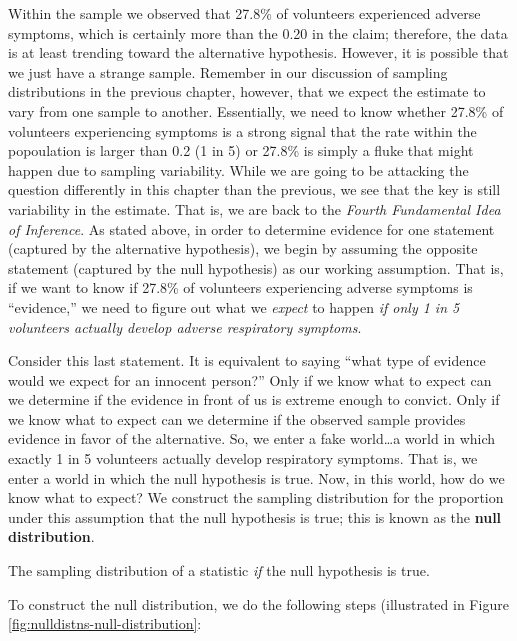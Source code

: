 \documentclass[]{book}
\theoremstyle{definition}
\theoremstyle{definition}
\theoremstyle{definition}
\theoremstyle{remark}
\let\BeginKnitrBlock\begin \let\EndKnitrBlock\end
\begin{document}
Within the sample we observed that 27.8\% of volunteers experienced
adverse symptoms, which is certainly more than the 0.20 in the claim;
therefore, the data is at least trending toward the alternative
hypothesis. However, it is possible that we just have a strange sample.
Remember in our discussion of sampling distributions in the previous
chapter, however, that we expect the estimate to vary from one sample to
another. Essentially, we need to know whether 27.8\% of volunteers
experiencing symptoms is a strong signal that the rate within the
popoulation is larger than 0.2 (1 in 5) or 27.8\% is simply a fluke that
might happen due to sampling variability. While we are going to be
attacking the question differently in this chapter than the previous, we
see that the key is still variability in the estimate. That is, we are
back to the \emph{Fourth Fundamental Idea of Inference}. As stated
above, in order to determine evidence for one statement (captured by the
alternative hypothesis), we begin by assuming the opposite statement
(captured by the null hypothesis) as our working assumption. That is, if
we want to know if 27.8\% of volunteers experiencing adverse symptoms is
``evidence,'' we need to figure out what we \emph{expect} to happen
\emph{if only 1 in 5 volunteers actually develop adverse respiratory
symptoms}.

Consider this last statement. It is equivalent to saying ``what type of
evidence would we expect for an innocent person?'' Only if we know what
to expect can we determine if the evidence in front of us is extreme
enough to convict. Only if we know what to expect can we determine if
the observed sample provides evidence in favor of the alternative. So,
we enter a fake world\ldots{}a world in which exactly 1 in 5 volunteers
actually develop respiratory symptoms. That is, we enter a world in
which the null hypothesis is true. Now, in this world, how do we know
what to expect? We construct the sampling distribution for the
proportion under this assumption that the null hypothesis is true; this
is known as the \textbf{null distribution}.

\BeginKnitrBlock{definition}[Null Distribution]
\protect\hypertarget{def:defn-null-distribution}{}{\label{def:defn-null-distribution}
{} }The sampling distribution of a
statistic \emph{if} the null hypothesis is true.
\EndKnitrBlock{definition}

To construct the null distribution, we do the following steps
(illustrated in Figure \ref{fig:nulldistns-null-distribution}:
\end{document}
